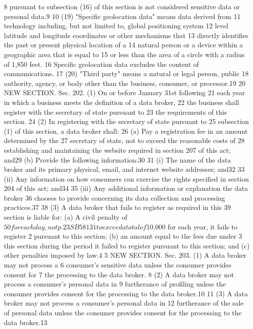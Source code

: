 8 pursuant to subsection (16) of this section is not considered
sensitive data or personal data.9
10 (19) "Specific geolocation data" means data derived from
11 technology including, but not limited to, global positioning system
12 level latitude and longitude coordinates or other mechanisms that
13 directly identifies the past or present physical location of a
14 natural person or a device within a geographic area that is equal to
15 or less than the area of a circle with a radius of 1,850 feet.
16 Specific geolocation data excludes the content of communications.
17 (20) "Third party" means a natural or legal person, public
18 authority, agency, or body other than the business, consumer, or
processor.19
20 NEW SECTION. Sec. 202. (1) On or before January 31st following
21 each year in which a business meets the definition of a data broker,
22 the business shall register with the secretary of state pursuant to
23 the requirements of this section.
24 (2) In registering with the secretary of state pursuant to
25 subsection (1) of this section, a data broker shall:
26 (a) Pay a registration fee in an amount determined by the
27 secretary of state, not to exceed the reasonable costs of
28 establishing and maintaining the website required in section 207 of
this act; and29
(b) Provide the following information:30
31 (i) The name of the data broker and its primary physical, email,
and internet website addresses; and32
33 (ii) Any information on how consumers can exercise the rights
specified in section 204 of this act; and34
35 (iii) Any additional information or explanation the data broker
36 chooses to provide concerning its data collection and processing
practices.37
38 (3) A data broker that fails to register as required in this
39 section is liable for: (a) A civil penalty of $50 for each day, not
p. 23 SB 5813
1 to exceed a total of $10,000 for each year, it fails to register
2 pursuant to this section; (b) an amount equal to the fees due under
3 this section during the period it failed to register pursuant to this
section; and (c) other penalties imposed by law.4
5 NEW SECTION. Sec. 203. (1) A data broker may not process a
6 consumer's sensitive data unless the consumer provides consent for
7 the processing to the data broker.
8 (2) A data broker may not process a consumer's personal data in
9 furtherance of profiling unless the consumer provides consent for the
processing to the data broker.10
11 (3) A data broker may not process a consumer's personal data in
12 furtherance of the sale of personal data unless the consumer provides
consent for the processing to the data broker.13
